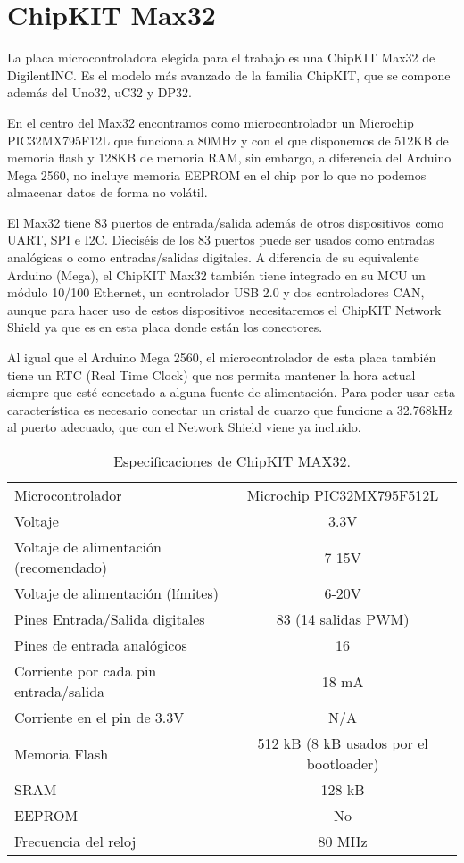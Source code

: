 \section{ChipKIT Max32}
La placa microcontroladora elegida para el trabajo es una ChipKIT Max32 de DigilentINC. Es el modelo más avanzado de la familia ChipKIT, que se compone además del Uno32, uC32 y DP32.


En el centro del Max32 encontramos como microcontrolador un Microchip PIC32MX795F12L que funciona a 80MHz y con el que disponemos de 512KB de memoria flash y 128KB de memoria RAM, sin embargo, a diferencia del Arduino Mega 2560, no incluye memoria EEPROM en el chip por lo que no podemos almacenar datos de forma no volátil. 

El Max32 tiene 83 puertos de entrada/salida además de otros dispositivos como UART, SPI e I2C. Dieciséis de los 83 puertos puede ser usados como entradas analógicas o como entradas/salidas digitales. A diferencia de su equivalente Arduino (Mega), el ChipKIT Max32 también tiene integrado en su MCU un módulo 10/100 Ethernet, un controlador USB 2.0 y dos controladores CAN, aunque para hacer uso de estos dispositivos necesitaremos el ChipKIT Network Shield ya que es en esta placa donde están los conectores. 

Al igual que el Arduino Mega 2560, el microcontrolador de esta placa también tiene un RTC (Real Time Clock) que nos permita mantener la hora actual siempre que esté conectado a alguna fuente de alimentación. Para poder usar esta característica es necesario conectar un cristal de cuarzo que funcione a 32.768kHz al puerto adecuado, que con el Network Shield viene ya incluido.

\begin{table}[H]
\begin{center}
\begin{tabular}{| l | c |}
\hline
Microcontrolador 						& Microchip PIC32MX795F512L \\
Voltaje									& 3.3V \\
Voltaje de alimentación (recomendado) 	& 7-15V \\
Voltaje de alimentación (límites) 		& 6-20V \\
Pines Entrada/Salida digitales			& 83 (14 salidas PWM) \\
Pines de entrada analógicos				& 16 \\
Corriente por cada pin entrada/salida 	& 18 mA \\
Corriente en el pin de 3.3V				& N/A  \\
Memoria Flash 							& 512 kB (8 kB usados por el bootloader) \\
SRAM									& 128 kB \\
EEPROM									& No \\
Frecuencia del reloj					& 80 MHz \\
\hline
\end{tabular}
\end{center}
\caption{Especificaciones de ChipKIT MAX32.}
\label{tab:max32_specs}
\end{table}

